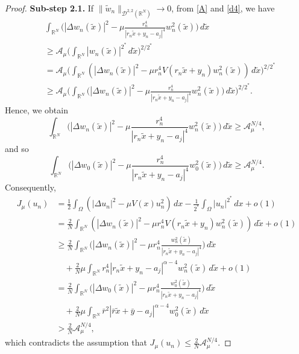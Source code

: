 \documentclass[10pt,a4paper]{amsart}
\numberwithin{equation}{section}
\begin{document}
\begin{proof}
 \textbf{Sub-step 2.1.}
  If \(\|\tilde{w}_n\|_{ \mathcal{D}^{2,2}(\mathbb{R}^N)}\to 0\), from \eqref{A} and 
 \eqref{d4}, we have
 \begin{align*}
&\int_{\mathbb{R}^N}\Big( |\Delta w_n(\tilde{x})|^2-\mu \frac{r_n^4}{\left| 
r_{n}\tilde{x}+y_n-a_j\right| ^4}w_n^2(\tilde{x})\Big)\,d\tilde{x}\\
 &\geq \mathcal{A}_{\mu} \Big( \int _{\mathbb{R}^N}|w_n(\tilde{x})|^{2^*}
  \,d\tilde{x}\Big) ^{2/2^*}\\
 &=\mathcal{A}_{\mu} \Big(\int_{\mathbb{R}^N}\left( |\Delta w_n(\tilde{x})|^2
  -\mu r_n^4 V(r_n\tilde{x}+y_n)w_n^2(\tilde{x})\right) \,d\tilde{x}\Big)^{2/2^*}\\
 &\geq \mathcal{A}_{\mu} \Big(\int_{\mathbb{R}^N}\Big( |\Delta w_n(\tilde{x})|^2
 -\mu \frac{r_n^4}{\left| r_{n}\tilde{x}+y_n-a_j\right| ^4}w_n^2(\tilde{x})\Big) 
 \,d\tilde{x}\Big)^{2/2^*}.
 \end{align*}
Hence, we obtain
 \[
 \int_{\mathbb{R}^N}\Big( |\Delta w_n(\tilde{x})|^2-\mu \frac{r_n^4}
 {\left| r_{n}\tilde{x}+y_n-a_j\right| ^4}w_n^2(\tilde{x})\Big)\,d\tilde{x}
 \geq \mathcal{A}_{\mu}^{N/4},
 \]
and so
 \[
 \int_{\mathbb{R}^N}\Big( |\Delta w_0(\tilde{x})|^2-\mu \frac{r_n^4}{|r_n
 \tilde{x}+y_n-a_j|^4}w_0^2(\tilde{x})\Big)\,d\tilde{x}
 \geq \mathcal{A}_{\mu}^{N/4}.
 \]
Consequently, 
 \begin{align*}
 J_{\mu}(u_n)
 &=\frac{1}{2}\int_{\Omega}(|\Delta u_n|^2-\mu V(x)u_n^2)\,dx
  -\frac{1}{2^*} \int_{\Omega} |u_n|^{2^*}\,dx+o(1)\\
 &=\frac{2}{N}\int_{\mathbb{R}^N}\left( |\Delta w_n(\tilde{x})|^2
  -\mu r_n^4 V(r_n\tilde{x}+y_n)w_n^2(\tilde{x})\right)\,d\tilde{x}+o(1)\\
 &\geq \frac{2}{N}\int_{\mathbb{R}^N}
 \Big( |\Delta w_n(\tilde{x})|^2-\mu r_n^4\frac{w_n^2(\tilde{x})}
 {|r_n \tilde{x}+y_n-a_j|^4}\Big)\,d\tilde{x}\\
 &\quad  +\frac{2}{N} \mu \int_{\mathbb{R}^N}r_n^4|r_n \tilde{x}+y_n-a_j
  |^{\alpha-4}w_n^2(\tilde{x})\,d\tilde{x}+o(1)\\
 &=\frac{2}{N}\int_{\mathbb{R}^N}\Big( |\Delta w_0(\tilde{x})|^2
  -\mu r_n^4\frac{w_0^2(\tilde{x})}{|r_n \tilde{x}+y_n-a_j|^4}\Big)\,d\tilde{x} \\
 &\quad +\frac{2}{N}\mu \int_{\mathbb{R}^N}\bar{r}^2|\bar{r}\tilde{x}+\bar{y}
 -a_j|^{\alpha-4}w_0^2(\tilde{x})\,d\tilde{x}\\
 &> \frac{2}{N}\mathcal{A}_{\mu}^{N/4},
 \end{align*}
which contradicts the assumption that 
\(J_{\mu}(u_n)\leq \frac{2}{N}\mathcal{A}_{\mu}^{N/4}\).
\smallskip


\end{proof}
\end{document}
